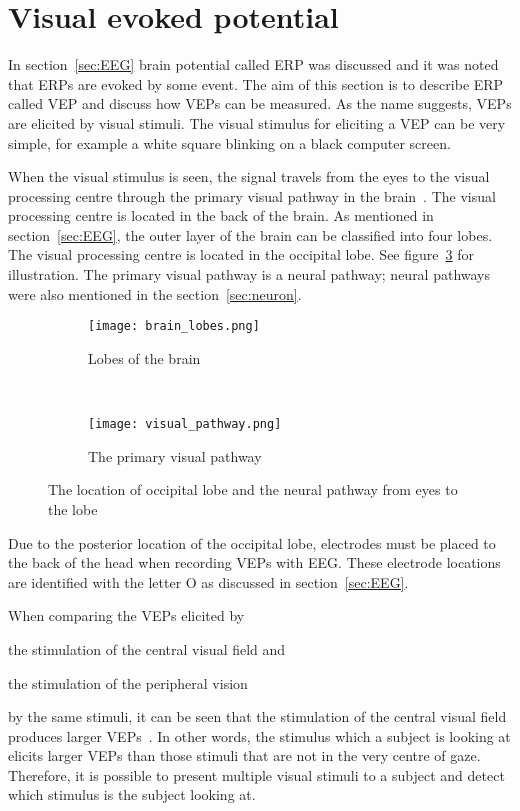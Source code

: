 \section{Visual evoked potential}
\label{sec:VEP}

In section~\ref{sec:EEG} brain potential called \gls{ERP} was discussed and it was noted that \glspl{ERP} are evoked by some event. The aim of this section is to describe \gls{ERP} called \gls{VEP} and discuss how \glspl{VEP} can be measured. As the name suggests, \glspl{VEP} are elicited by visual stimuli. The visual stimulus for eliciting a \gls{VEP} can be very simple, for example a white square blinking on a black computer screen.

When the visual stimulus is seen, the signal travels from the eyes to the \gls{visual processing centre} through the \gls{primary visual pathway} in the brain~\cite{neuroscience}. The \gls{visual processing centre} is located in the back of the brain. As mentioned in section~\ref{sec:EEG}, the outer layer of the brain can be classified into four lobes. The \gls{visual processing centre} is located in the occipital lobe. See figure~\ref{fig:lobes_pathway} for illustration. The \gls{primary visual pathway} is a \gls{neural pathway}; \glspl{neural pathway} were also mentioned in the section~\ref{sec:neuron}.

\begin{figure}[t]
	\centering
	\begin{subfigure}{0.48\textwidth}
		\texttt{[image: brain\_lobes.png]}
		\caption{Lobes of the brain~\cite{blausen}}
		\label{fig:brain_lobes}
	\end{subfigure}
	~
	\begin{subfigure}{0.48\textwidth}
		\texttt{[image: visual\_pathway.png]}
		\caption{The primary visual pathway~\cite[p.~261]{neuroscience}}
		\label{fig:visual_pathway}
	\end{subfigure}
	\caption{The location of occipital lobe and the neural pathway from eyes to the lobe}
	\label{fig:lobes_pathway}
\end{figure}

Due to the posterior location of the occipital lobe, electrodes must be placed to the back of the head when recording \glspl{VEP} with \gls{EEG}. These electrode locations are identified with the letter O as discussed in section~\ref{sec:EEG}.

When comparing the \glspl{VEP} elicited by
\begin{enumerate*}[(1)]
	\item the stimulation of the \gls{central visual field} and
	\item the stimulation of the \gls{peripheral vision}
\end{enumerate*} by the same stimuli, it can be seen that the stimulation of the \gls{central visual field} produces larger \glspl{VEP}~\cite{VEP_size}. In other words, the stimulus which a subject is looking at elicits larger \glspl{VEP} than those stimuli that are not in the very centre of gaze. Therefore, it is possible to present multiple visual stimuli to a subject and detect which stimulus is the subject looking at. 

